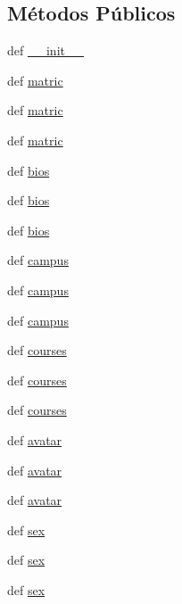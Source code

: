 \subsection*{Métodos Públicos}
\begin{DoxyCompactItemize}
\item 
def \hyperlink{classELO_1_1EntityUnit_1_1Professor_a9c5d85cebcb21faceb88528595762d8a}{\-\_\-\-\_\-init\-\_\-\-\_\-}
\item 
def \hyperlink{classELO_1_1EntityUnit_1_1Professor_aeed7183438ff461d33bd0f7a9d179058}{matric}
\item 
def \hyperlink{classELO_1_1EntityUnit_1_1Professor_aeed7183438ff461d33bd0f7a9d179058}{matric}
\item 
def \hyperlink{classELO_1_1EntityUnit_1_1Professor_aeed7183438ff461d33bd0f7a9d179058}{matric}
\item 
def \hyperlink{classELO_1_1EntityUnit_1_1Professor_a2972bd0f21f4ff0ebfb1cada717386ac}{bios}
\item 
def \hyperlink{classELO_1_1EntityUnit_1_1Professor_a2972bd0f21f4ff0ebfb1cada717386ac}{bios}
\item 
def \hyperlink{classELO_1_1EntityUnit_1_1Professor_a2972bd0f21f4ff0ebfb1cada717386ac}{bios}
\item 
def \hyperlink{classELO_1_1EntityUnit_1_1Professor_a561d5ad5396226805832c6e4cef1bd10}{campus}
\item 
def \hyperlink{classELO_1_1EntityUnit_1_1Professor_a561d5ad5396226805832c6e4cef1bd10}{campus}
\item 
def \hyperlink{classELO_1_1EntityUnit_1_1Professor_a561d5ad5396226805832c6e4cef1bd10}{campus}
\item 
def \hyperlink{classELO_1_1EntityUnit_1_1Professor_adad835563fb2eba52ed5015abaf8808f}{courses}
\item 
def \hyperlink{classELO_1_1EntityUnit_1_1Professor_adad835563fb2eba52ed5015abaf8808f}{courses}
\item 
def \hyperlink{classELO_1_1EntityUnit_1_1Professor_adad835563fb2eba52ed5015abaf8808f}{courses}
\item 
def \hyperlink{classELO_1_1EntityUnit_1_1Professor_a158f4ccf788610ba580639216b621c5b}{avatar}
\item 
def \hyperlink{classELO_1_1EntityUnit_1_1Professor_a158f4ccf788610ba580639216b621c5b}{avatar}
\item 
def \hyperlink{classELO_1_1EntityUnit_1_1Professor_a158f4ccf788610ba580639216b621c5b}{avatar}
\item 
def \hyperlink{classELO_1_1EntityUnit_1_1Professor_a2244fa9a5f02a5845cc6c0686b2cf08a}{sex}
\item 
def \hyperlink{classELO_1_1EntityUnit_1_1Professor_a2244fa9a5f02a5845cc6c0686b2cf08a}{sex}
\item 
def \hyperlink{classELO_1_1EntityUnit_1_1Professor_a2244fa9a5f02a5845cc6c0686b2cf08a}{sex}
\end{DoxyCompactItemize}
